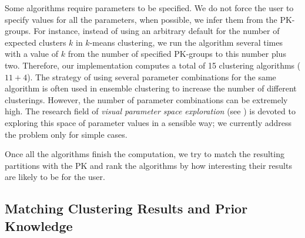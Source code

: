Some algorithms require parameters to be specified. We do not force the user to specify values for all the parameters, when possible, we infer them from the PK-groups. For instance, instead of using an arbitrary default for the number of expected clusters $k$ in $k$-means clustering, we run the algorithm several times with a value of $k$ from the number of specified PK-groups to this number plus two. Therefore, our implementation computes a total of 15 clustering algorithms ($11+4$).
%
The strategy of using several parameter combinations for the same algorithm is often used in ensemble clustering to increase the number of different clusterings.
However, the number of parameter combinations can be extremely high. The research field of \emph{visual parameter space exploration} (see \eg \cite{6876043}) is devoted to exploring this space of parameter values in a sensible way; we currently address the problem only for simple cases.



Once all the algorithms finish the computation, we try to match the resulting partitions with the PK and rank the algorithms by how interesting their results are likely to be for the user.


\subsection{Matching Clustering Results and Prior Knowledge}
\label{sec:matching}

